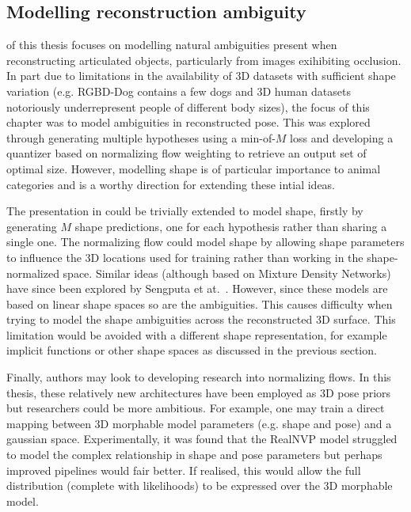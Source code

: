 

\subsection{Modelling reconstruction ambiguity}



 of this thesis focuses on modelling natural ambiguities present when reconstructing articulated objects, particularly from images exihibiting occlusion. In part due to limitations in the availability of 3D datasets with sufficient shape variation (e.g. RGBD-Dog contains a few dogs and 3D human datasets notoriously underrepresent people of different body sizes), the focus of this chapter was to model ambiguities in reconstructed pose. This was explored through generating multiple hypotheses using a min-of-$M$ loss and developing a quantizer based on normalizing flow weighting to retrieve an output set of optimal size. However, modelling shape is of particular importance to animal categories and is a worthy direction for extending these intial ideas. 

The presentation in  could be trivially extended to model shape, firstly by generating $M$ shape predictions, one for each hypothesis rather than sharing a single one. The normalizing flow could model shape by allowing shape parameters to influence the 3D locations used for training rather than working in the shape-normalized space. Similar ideas (although based on Mixture Density Networks) have since been explored by Sengputa et at.~. However, since these models are based on linear shape spaces so are the ambiguities. This causes difficulty when trying to model the shape ambiguities across the reconstructed 3D surface. This limitation would be avoided with a different shape representation, for example implicit functions or other shape spaces as discussed in the previous section.

Finally, authors may look to developing research into normalizing flows. In this thesis, these relatively new architectures have been employed as 3D pose priors but researchers could be more ambitious. For example, one may train a direct mapping between 3D morphable model parameters (e.g. shape and pose) and a gaussian space. Experimentally, it was found that the RealNVP model struggled to model the complex relationship in shape and pose parameters but perhaps improved pipelines would fair better. If realised, this would allow the full distribution (complete with likelihoods) to be expressed over the 3D morphable model.

